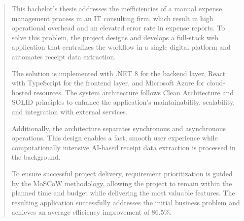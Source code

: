 \begin{abstract}
This bachelor's thesis addresses the inefficiencies of a manual expense management process in an IT consulting firm, which result in high operational overhead and an elevated error rate in expense reports. To solve this problem, the project designs and develops a full-stack web application that centralizes the workflow in a single digital platform and automates receipt data extraction.

The solution is implemented with .NET 8 for the backend layer, React with TypeScript for the frontend layer, and Microsoft Azure for cloud-hosted resources. The system architecture follows Clean Architecture and SOLID principles to enhance the application's maintainability, scalability, and integration with external services.

Additionally, the architecture separates synchronous and asynchronous operations. This design enables a fast, smooth user experience while computationally intensive AI-based receipt data extraction is processed in the background.

To ensure successful project delivery, requirement prioritization is guided by the MoSCoW methodology, allowing the project to remain within the planned time and budget while delivering the most valuable features. The resulting application successfully addresses the initial business problem and achieves an average efficiency improvement of 86.5\%.
\end{abstract}